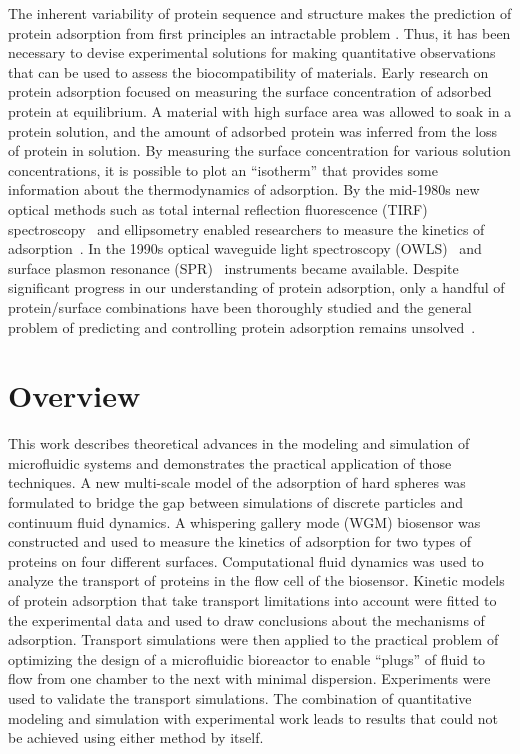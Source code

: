 The inherent variability of protein sequence and structure makes the
prediction of protein adsorption from first principles an intractable
problem \cite{Wilson2004}. Thus, it has been necessary to devise
experimental solutions for making quantitative observations that can
be used to assess the biocompatibility of materials. Early research
on protein adsorption focused on measuring the surface concentration
of adsorbed protein at equilibrium. A material with high surface area
was allowed to soak in a protein solution, and the amount of adsorbed
protein was inferred from the loss of protein in solution. By measuring
the surface concentration for various solution concentrations, it
is possible to plot an {}``isotherm'' that provides some information
about the thermodynamics of adsorption. By the mid-1980s new optical
methods such as total internal reflection fluorescence (TIRF) spectroscopy~\cite{Axelrod1983}
and ellipsometry enabled researchers to measure the kinetics of adsorption~\cite{Andrade1986}.
In the 1990s optical waveguide light spectroscopy (OWLS)~\cite{Kurrat1997}
and surface plasmon resonance (SPR)~\cite{Mrksich1995} instruments
became available. Despite significant progress in our understanding
of protein adsorption, only a handful of protein/surface combinations
have been thoroughly studied and the general problem of predicting
and controlling protein adsorption remains unsolved~\cite{Rabe2010,Gray2004}.


\section{Overview}

This work describes theoretical advances in the modeling and simulation
of microfluidic systems and demonstrates the practical application
of those techniques. A new multi-scale model of the adsorption of
hard spheres was formulated to bridge the gap between simulations
of discrete particles and continuum fluid dynamics. A whispering gallery
mode (WGM) biosensor was constructed and used to measure the kinetics
of adsorption for two types of proteins on four different surfaces.
Computational fluid dynamics was used to analyze the transport of
proteins in the flow cell of the biosensor. Kinetic models of protein
adsorption that take transport limitations into account were fitted
to the experimental data and used to draw conclusions about the mechanisms
of adsorption. Transport simulations were then applied to the practical
problem of optimizing the design of a microfluidic bioreactor to enable
{}``plugs'' of fluid to flow from one chamber to the next with minimal
dispersion. Experiments were used to validate the transport simulations.
The combination of quantitative modeling and simulation with experimental
work leads to results that could not be achieved using either method
by itself.
